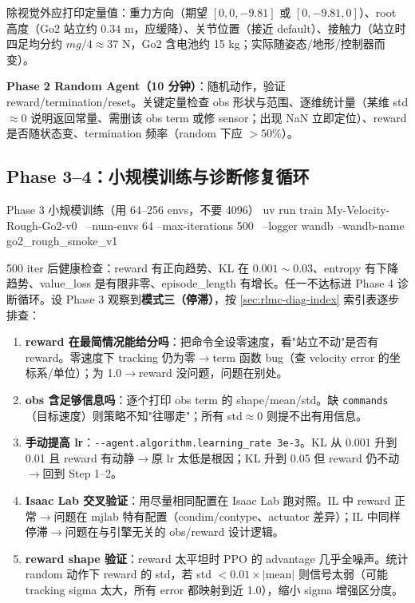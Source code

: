 除视觉外应打印定量值：重力方向（期望 $[0,0,-9.81]$ 或 $[0,-9.81,0]$）、root 高度（Go2 站立约 $0.34$ m，应缓降）、关节位置（接近 default）、接触力（站立时四足均分约 $mg/4\approx 37$ N，Go2 含电池约 15 kg；实际随姿态/地形/控制器而变）。

\textbf{Phase 2 Random Agent（10 分钟）}：随机动作，验证 reward/termination/reset。关键定量检查 obs 形状与范围、逐维统计量（某维 std$\approx 0$ 说明返回常量、需删该 obs term 或修 sensor；出现 NaN 立即定位）、reward 是否随状态变、termination 频率（random 下应 $>50\%$）。

\subsection{Phase 3--4：小规模训练与诊断修复循环}

\begin{codebox}[bash]{Phase 3 小规模训练（用 64--256 envs，不要 4096）}
uv run train My-Velocity-Rough-Go2-v0 \
  --num-envs 64 --max-iterations 500 \
  --logger wandb --wandb-name go2_rough_smoke_v1
\end{codebox}

500 iter 后健康检查：reward 有正向趋势、KL 在 $0.001\sim0.03$、entropy 有下降趋势、value\_loss 是有限非零、episode\_length 有增长。任一不达标进 Phase 4 诊断循环。设 Phase 3 观察到\textbf{模式三（停滞）}，按 \cref{sec:rlmc-diag-index} 索引表逐步排查：

\begin{enumerate}
  \item \textbf{reward 在最简情况能给分吗}：把命令全设零速度，看"站立不动"是否有 reward。零速度下 tracking 仍为零$\to$term 函数 bug（查 velocity error 的坐标系/单位）；为 1.0$\to$reward 没问题，问题在别处。
  \item \textbf{obs 含足够信息吗}：逐个打印 obs term 的 shape/mean/std。缺 \verb|commands|（目标速度）则策略不知"往哪走"；所有 std$\approx 0$ 则提不出有用信息。
  \item \textbf{手动提高 lr}：\verb|--agent.algorithm.learning_rate 3e-3|。KL 从 0.001 升到 0.01 且 reward 有动静$\to$原 lr 太低是根因；KL 升到 0.05 但 reward 仍不动$\to$回到 Step 1--2。
  \item \textbf{Isaac Lab 交叉验证}：用尽量相同配置在 Isaac Lab 跑对照。IL 中 reward 正常$\to$问题在 mjlab 特有配置（condim/contype、actuator 差异）；IL 中同样停滞$\to$问题在与引擎无关的 obs/reward 设计逻辑。
  \item \textbf{reward shape 验证}：reward 太平坦时 PPO 的 advantage 几乎全噪声。统计 random 动作下 reward 的 std，若 std $< 0.01\times|\text{mean}|$ 则信号太弱（可能 tracking sigma 太大，所有 error 都映射到近 1.0），缩小 sigma 增强区分度。
\end{enumerate}

